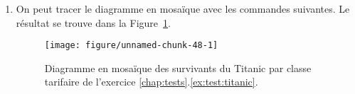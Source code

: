 \begin{solution}{6.12}
\begin{enumerate}
\item On peut tracer le diagramme en mosaïque avec les commandes suivantes. Le résultat se trouve dans la Figure~\ref{fig:test:Titanic}.
\begin{knitrout}
\color{fgcolor}\begin{kframe}
\begin{alltt}
 \hlkwb{<-} \hlstd{(}\hlstd{(}\hlstd{,}\hlstd{,}\hlstd{,}\hlstd{,}\hlstd{,}\hlstd{,}\hlstd{,}\hlstd{),}\hlstd{=}\hlstd{,}
              \hlstd{=}\hlstd{(}\hlstd{=}\hlstd{(}\hlstd{,}\hlstd{),}
                         \hlstd{=}\hlstd{(}\hlstd{,}\hlstd{,}\hlstd{,}\hlstd{)))}
\hlstd{(} \hlstd{=}\hlstd{,} \hlstd{=}\hlstd{)}
\end{alltt}
\end{kframe}
\end{knitrout}

\begin{figure}
        \centering
\begin{knitrout}
\color{fgcolor}
\texttt{[image: figure/unnamed-chunk-48-1]}

\end{knitrout}
        \caption{Diagramme en mosaïque des survivants du Titanic par classe tarifaire de
          l'exercice
          \ref{chap:tests}.\ref{ex:test:titanic}.}
        \label{fig:test:Titanic}
      \end{figure}

\end{enumerate}
\end{solution}
